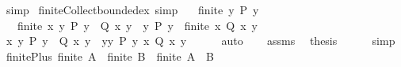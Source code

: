 \begin{isabellebody}
\ simp\isanewline
{}\isamarkupfalse%
%
\endisatagproof
{\isafoldproof}%
%
\isadelimproof
\isanewline
%
\endisadelimproof
\isanewline
{}\isamarkupfalse%
\ finite{\isacharunderscore}{\kern0pt}Collect{\isacharunderscore}{\kern0pt}bounded{\isacharunderscore}{\kern0pt}ex\ {\isacharbrackleft}{\kern0pt}simp{\isacharbrackright}{\kern0pt}{\isacharcolon}{\kern0pt}\isanewline
\ \ \ {\isachardoublequoteopen}finite\ {\isacharbraceleft}{\kern0pt}y{\isachardot}{\kern0pt}\ P\ y{\isacharbraceright}{\kern0pt}{\isachardoublequoteclose}\isanewline
\ \ \ {\isachardoublequoteopen}finite\ {\isacharbraceleft}{\kern0pt}x{\isachardot}{\kern0pt}\ {\isasymexists}y{\isachardot}{\kern0pt}\ P\ y\ {\isasymand}\ Q\ x\ y{\isacharbraceright}{\kern0pt}\ {\isasymlongleftrightarrow}\ {\isacharparenleft}{\kern0pt}{\isasymforall}y{\isachardot}{\kern0pt}\ P\ y\ {\isasymlongrightarrow}\ finite\ {\isacharbraceleft}{\kern0pt}x{\isachardot}{\kern0pt}\ Q\ x\ y{\isacharbraceright}{\kern0pt}{\isacharparenright}{\kern0pt}{\isachardoublequoteclose}\isanewline
%
\isadelimproof
%
\endisadelimproof
%
\isatagproof
{}\isamarkupfalse%
\ {\isacharminus}{\kern0pt}\isanewline
\ \ \isamarkupfalse%
\ {\isachardoublequoteopen}{\isacharbraceleft}{\kern0pt}x{\isachardot}{\kern0pt}\ {\isasymexists}y{\isachardot}{\kern0pt}\ P\ y\ {\isasymand}\ Q\ x\ y{\isacharbraceright}{\kern0pt}\ {\isacharequal}{\kern0pt}\ {\isacharparenleft}{\kern0pt}{\isasymUnion}y{\isasymin}{\isacharbraceleft}{\kern0pt}y{\isachardot}{\kern0pt}\ P\ y{\isacharbraceright}{\kern0pt}{\isachardot}{\kern0pt}\ {\isacharbraceleft}{\kern0pt}x{\isachardot}{\kern0pt}\ Q\ x\ y{\isacharbraceright}{\kern0pt}{\isacharparenright}{\kern0pt}{\isachardoublequoteclose}\isanewline
\ \ \ \ \isamarkupfalse%
\ auto\isanewline
\ \ \isamarkupfalse%
\ assms\ \isamarkupfalse%
\ {\isacharquery}{\kern0pt}thesis\isanewline
\ \ \ \ \isamarkupfalse%
\ simp\isanewline
{}\isamarkupfalse%
%
\endisatagproof
{\isafoldproof}%
%
\isadelimproof
\isanewline
%
\endisadelimproof
\isanewline
{}\isamarkupfalse%
\ finite{\isacharunderscore}{\kern0pt}Plus{\isacharcolon}{\kern0pt}\ {\isachardoublequoteopen}finite\ A\ {\isasymLongrightarrow}\ finite\ B\ {\isasymLongrightarrow}\ finite\ {\isacharparenleft}{\kern0pt}A\ {\isacharless}{\kern0pt}{\isacharplus}{\kern0pt}{\isachargreater}{\kern0pt}\ B{\isacharparenright}{\kern0pt}{\isachardoublequoteclose}\isanewline
%
\isadelimproof
\ \ %
\endisadelimproof
%
\isatagproof

\end{isabellebody}
